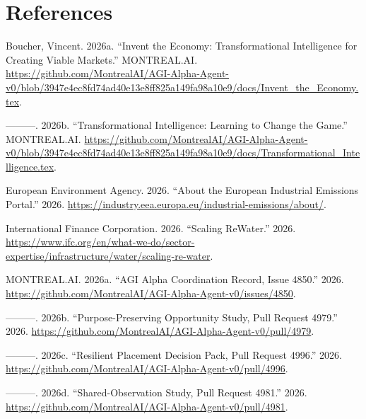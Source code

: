\documentclass[
  11pt,
  letterpaper,
]{article}
\newlength{\cslhangindent}
\newlength{\cslentryspacingunit} %
\newenvironment{CSLReferences}[2] %
 {%
  \setlength{\parindent}{0pt}
  \ifodd #1
  \let\oldpar\par
  \def\par{\hangindent=\cslhangindent\oldpar}
  \fi
  \setlength{\parskip}{#2\cslentryspacingunit}
 }%
 {}
\begin{document}
\clearpage

\hypertarget{references}{%
\section*{References}\label{references}}

\hypertarget{refs}{}
\begin{CSLReferences}{1}{0}
\leavevmode{}%
Boucher, Vincent. 2026a. {``Invent the Economy: Transformational
Intelligence for Creating Viable Markets.''} MONTREAL.AI.
\url{https://github.com/MontrealAI/AGI-Alpha-Agent-v0/blob/3947e4ec8fd74ad40e13e8ff825a149fa98a10e9/docs/Invent_the_Economy.tex}.

\leavevmode{}%
---------. 2026b. {``Transformational Intelligence: Learning to Change
the Game.''} MONTREAL.AI.
\url{https://github.com/MontrealAI/AGI-Alpha-Agent-v0/blob/3947e4ec8fd74ad40e13e8ff825a149fa98a10e9/docs/Transformational_Intelligence.tex}.

\leavevmode{}%
European Environment Agency. 2026. {``About the European Industrial
Emissions Portal.''} 2026.
\url{https://industry.eea.europa.eu/industrial-emissions/about/}.

\leavevmode{}%
International Finance Corporation. 2026. {``Scaling ReWater.''} 2026.
\url{https://www.ifc.org/en/what-we-do/sector-expertise/infrastructure/water/scaling-re-water}.

\leavevmode{}%
MONTREAL.AI. 2026a. {``AGI Alpha Coordination Record, Issue 4850.''}
2026.
\url{https://github.com/MontrealAI/AGI-Alpha-Agent-v0/issues/4850}.

\leavevmode{}%
---------. 2026b. {``Purpose-Preserving Opportunity Study, Pull Request
4979.''} 2026.
\url{https://github.com/MontrealAI/AGI-Alpha-Agent-v0/pull/4979}.

\leavevmode{}%
---------. 2026c. {``Resilient Placement Decision Pack, Pull Request
4996.''} 2026.
\url{https://github.com/MontrealAI/AGI-Alpha-Agent-v0/pull/4996}.

\leavevmode{}%
---------. 2026d. {``Shared-Observation Study, Pull Request 4981.''}
2026. \url{https://github.com/MontrealAI/AGI-Alpha-Agent-v0/pull/4981}.


\end{CSLReferences}
\end{document}
